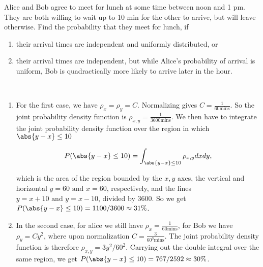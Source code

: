 \documentclass[english,a4paper,12pt]{report}
\begin{document}
{Alice and Bob agree to meet for lunch at some time between noon and 1 pm. They are both willing to wait up to 10 min for the other to arrive, but will leave otherwise. Find the probability that they meet for lunch, if
\begin{enumerate}[itemsep=10pt]
	\item their arrival times are independent and uniformly distributed, or
	\item their arrival times are independent, but while Alice's probability of arrival is uniform, Bob is quadractically more likely to arrive later in the hour.    
\end{enumerate}~}
{\begin{enumerate}
    \item For the first case, we have \(\rho _{x} = \rho _{y} = C\). Normalizing gives \(C = \frac{1}{60 \text{mins} } \). So the joint probability density function is \(\rho _{x,y} = \frac{1}{3600 \text{mins} }  \). We then have to integrate the joint probability density function over the region in which \(\abs{y-x} \le 10 \) 
    
    \begin{equation}
        P(\abs{y-x}\le 10 ) = \int_{\abs{y-x} \le 10}^{}\rho _{x,y}dxdy ,
    \end{equation}
    
    which is the area of the region bounded by the \(x,y\) axes, the vertical and horizontal \(y=60 \text { and } x=60\), respectively, and the lines \(y = x+10 \text { and } y = x-10\), divided by 3600. So we get \( P(\abs{y-x}\le 10 ) = 1100 /3600 \approx 31 \% \).
    
    \item In the second case, for alice we still have \(\rho _{x} = \frac{1}{60 \text{mins} }  \), for Bob we have \(\rho _{y}  = Cy^2 \), where upon normalization \(C = \frac{3}{60^3 \text{mins} } \). The joint probability density function is therefore \( \rho _{x,y} = 3 y^2 / 60^2\). Carrying out the double integral over the same region, we get \( P(\abs{y-x}\le 10 ) = 767 /2592 \approx 30\% \).  
\end{enumerate}~
} 
\end{document}
